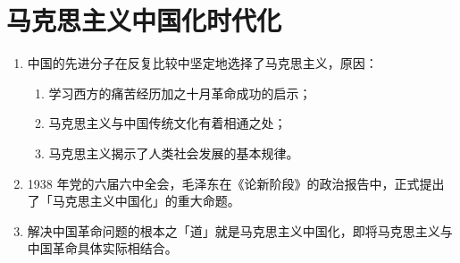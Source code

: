 \documentclass[UTF8]{ctexart}
\begin{document}
\newpage
{}
\BgThispage
{}
\setcounter{section}{-1}
\section{马克思主义中国化时代化}\label{sec:0}
\begin{enumerate}[start=1]
  \item 中国的先进分子在反复比较中坚定地选择了马克思主义，原因：
  \begin{enumerate}[label={\roman{enumii})}, start=1]
    \item 学习西方的痛苦经历加之十月革命成功的启示；
    \item 马克思主义与中国传统文化有着相通之处；
    \item 马克思主义揭示了人类社会发展的基本规律。
  \end{enumerate}
  \item 1938 年党的六届六中全会，毛泽东在《论新阶段》的政治报告中，正式提出了「马克思主义中国化」的重大命题。
  \item 解决中国革命问题的根本之「道」就是马克思主义中国化，即将马克思主义与中国革命具体实际相结合。
\end{enumerate}
\end{document}
